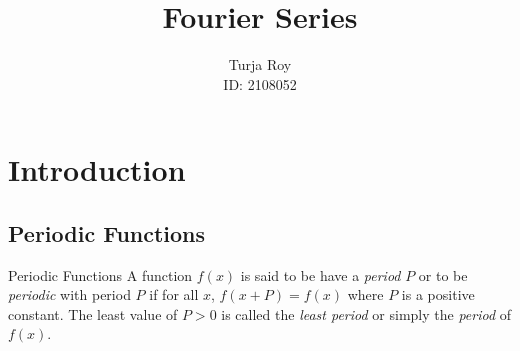 \documentclass[12pt]{article}
\title{
    \textbf{Fourier Series}
}
\author{
    Turja Roy\\
    ID: 2108052
}
\date{}
\begin{document}
\maketitle
\tableofcontents
\newpage


\section{Introduction}

\subsection{Periodic Functions}
\begin{definition}{Periodic Functions}{}
    A function $f(x)$ is said to be have a \textit{period} $P$ or to be \textit{periodic} with period $P$ if for all $x$, $f(x+P) = f(x)$ where $P$ is a positive constant. The least value of $P>0$ is called the \textit{least period} or simply the \textit{period} of $f(x)$.
\end{definition}
\end{document}
